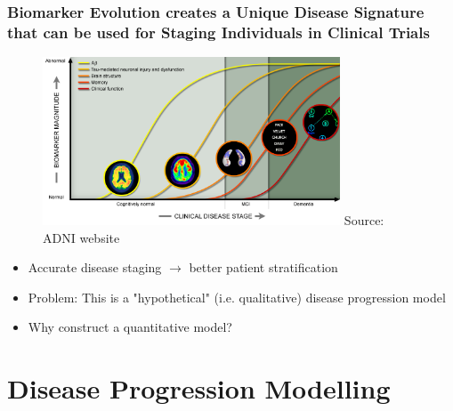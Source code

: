 \documentclass[8pt,xcolor=table,aspectratio=169]{beamer}
\begin{document}
\begin{frame}
\frametitle{Biomarker Evolution creates a Unique Disease Signature
that can be used for Staging Individuals in Clinical Trials}

\begin{figure}
\centering 
\vspace{-1em}
\includegraphics[height=5cm]{adniDiseaseProgression}
\hspace{-4em}Source: ADNI website 

\end{figure}


\begin{itemize}
 \item Accurate disease staging $\rightarrow$ better patient stratification
 \item Problem: This is a "hypothetical" (i.e. qualitative) disease progression model
 \item Why construct a quantitative model? 
\end{itemize}

\end{frame}


\section{Disease Progression Modelling}

% 
% 
% 
\end{document}
